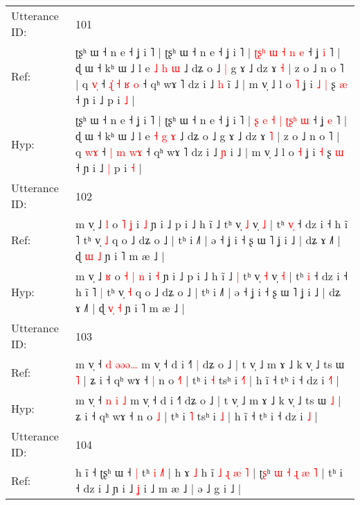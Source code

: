 \documentclass[10pt]{article}
\DeclareRobustCommand{\hl}[1]{{\textcolor{red}{#1}}}
\begin{document}
\begin{longtable}{ll}
 \\
\midrule
Utterance ID: & 101 \\
Ref: & ʈʂʰ ɯ ˧ n e ˧ ʝ i ˥ | ʈʂʰ ɯ ˧ n e ˧ ʝ i ˥ | \hl{ʈ}\hl{ʂ}\hl{ʰ} \hl{ɯ} \hl{˧} \hl{}\hl{}\hl{n} \hl{e} ˧ ʝ \hl{i} ˥ | ɖ ɯ ˧ kʰ ɯ ˩ l e \hl{˩} \hl{h} \hl{ɯ} ˩ dʑ o ˩\hl{ }\hl{|} g ɤ ˩ dz ɤ \hl{˧} | z o ˩ n o ˥ | q \hl{v}\hl{̩} ˧ \hl{ɻ}\hl{̍} \hl{˧} \hl{ʁ}\hl{ }\hl{o} ˧ qʰ wɤ ˥ dz i ˩ \hl{h} i\hl{̃} ˩ | m v̩ ˩ l o \hl{˥} ʝ i\hl{ }\hl{˩} \hl{|} ʂ \hl{æ} ˧ ɲ i ˩\hl{}\hl{} p i \hl{˩} |
 \\
Hyp: & ʈʂʰ ɯ ˧ n e ˧ ʝ i ˥ | ʈʂʰ ɯ ˧ n e ˧ ʝ i ˥ | \hl{ʂ}\hl{ }\hl{e} \hl{˧} \hl{|} \hl{ʈ}\hl{ʂ}\hl{ʰ} \hl{ɯ} ˧ ʝ \hl{e} ˥ | ɖ ɯ ˧ kʰ ɯ ˩ l e \hl{˧} \hl{g} \hl{ɤ} ˩ dʑ o ˩\hl{}\hl{} g ɤ ˩ dz ɤ \hl{˥} | z o ˩ n o ˥ | q \hl{w}\hl{ɤ} ˧ \hl{}\hl{|} \hl{m} \hl{}\hl{w}\hl{ɤ} ˧ qʰ wɤ ˥ dz i ˩ \hl{ɲ} i\hl{} ˩ | m v̩ ˩ l o \hl{˧} ʝ i\hl{}\hl{} \hl{˧} ʂ \hl{ɯ} ˧ ɲ i ˩\hl{ }\hl{|} p i \hl{˧} |
 \\
\midrule
Utterance ID: & 102 \\
Ref: & m v̩ ˩ \hl{l} o\hl{}\hl{} \hl{˥} \hl{ʝ} i \hl{˩} ɲ i ˩ p i ˩ h ĩ ˩\hl{}\hl{} tʰ v̩ \hl{˩} v̩ \hl{˩} | tʰ \hl{v}\hl{̩} ˧ dz i ˧ h ĩ ˥\hl{}\hl{} tʰ v̩ \hl{˩} q o ˩ dʑ o ˩ | tʰ i ˩˥ | ə ˧ ʝ i ˧ ʂ ɯ ˥ ʝ i ˩ | dʑ ɤ ˩˥ | ɖ \hl{}\hl{ɯ} \hl{˩} ɲ i ˥ m æ ˩ |
 \\
Hyp: & m v̩ ˩ \hl{ʁ} o\hl{ }\hl{˧} \hl{|} \hl{n} i \hl{˧} ɲ i ˩ p i ˩ h ĩ ˩\hl{ }\hl{|} tʰ v̩ \hl{˧} v̩ \hl{˧} | tʰ \hl{}\hl{i} ˧ dz i ˧ h ĩ ˥\hl{ }\hl{|} tʰ v̩ \hl{˧} q o ˩ dʑ o ˩ | tʰ i ˩˥ | ə ˧ ʝ i ˧ ʂ ɯ ˥ ʝ i ˩ | dʑ ɤ ˩˥ | ɖ \hl{v}\hl{̩} \hl{˧} ɲ i ˥ m æ ˩ |
 \\
\midrule
Utterance ID: & 103 \\
Ref: & m v̩ ˧ \hl{d} \hl{ə}\hl{ə}\hl{ə}\hl{…} m v̩ ˧ d i ˧˥\hl{ }\hl{|} dʑ o ˩ | t v̩ ˩ m ɤ ˩ k v̩ ˩ ts ɯ \hl{˥} | ʑ i ˧ qʰ wɤ ˧\hl{ }\hl{|} n o \hl{˧}\hl{˥} | tʰ i \hl{˧} tsʰ i \hl{˧}\hl{˥} | h ĩ ˧ tʰ i ˧ dz i \hl{˧}\hl{˥} |
 \\
Hyp: & m v̩ ˧ \hl{n} \hl{}\hl{i}\hl{ }\hl{˩} m v̩ ˧ d i ˧˥\hl{}\hl{} dʑ o ˩ | t v̩ ˩ m ɤ ˩ k v̩ ˩ ts ɯ \hl{˩} | ʑ i ˧ qʰ wɤ ˧\hl{}\hl{} n o \hl{}\hl{˩} | tʰ i \hl{˥} tsʰ i \hl{}\hl{˩} | h ĩ ˧ tʰ i ˧ dz i \hl{}\hl{˩} |
 \\
\midrule
Utterance ID: & 104 \\
Ref: & h ĩ ˧ ʈʂʰ ɯ ˧\hl{ }\hl{|} tʰ \hl{i} \hl{˩}\hl{˥} | h ɤ \hl{˩} h ĩ\hl{ }\hl{˩}\hl{ }\hl{ɻ}\hl{ }\hl{æ} \hl{˥} | ʈ\hl{ʂ}ʰ\hl{ }\hl{ɯ} \hl{˧} \hl{ɻ}\hl{ }\hl{æ} \hl{˥} | tʰ i ˧ dz i ˩ ɲ i ˩ \hl{ʝ} i ˩ m æ ˩ | ə ˩ g i ˩ |
 \\

\end{longtable}
\end{document}
